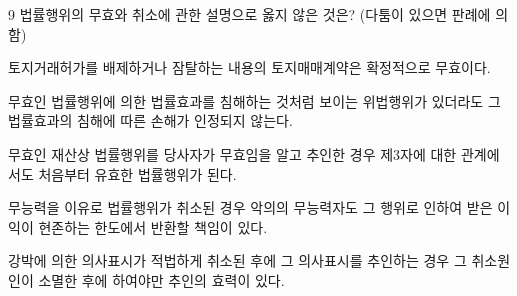 \begin{question}{9}
법률행위의 무효와 취소에 관한 설명으로 옳지 않은 것은? (다툼이 있으면 판례에 의함)
\begin{choices}
  \item 토지거래허가를 배제하거나 잠탈하는 내용의 토지매매계약은 확정적으로 무효이다.
  \item 무효인 법률행위에 의한 법률효과를 침해하는 것처럼 보이는 위법행위가 있더라도 그 법률효과의 침해에 따른 손해가 인정되지 않는다.
  \item 무효인 재산상 법률행위를 당사자가 무효임을 알고 추인한 경우 제3자에 대한 관계에서도 처음부터 유효한 법률행위가 된다.
  \item 무능력을 이유로 법률행위가 취소된 경우 악의의 무능력자도 그 행위로 인하여 받은 이익이 현존하는 한도에서 반환할 책임이 있다.
  \item 강박에 의한 의사표시가 적법하게 취소된 후에 그 의사표시를 추인하는 경우 그 취소원인이 소멸한 후에 하여야만 추인의 효력이 있다.
\end{choices}
\end{question}

